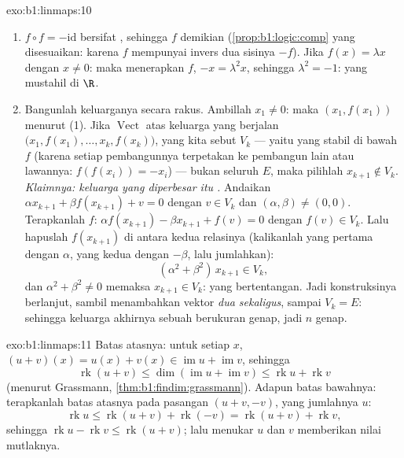 \begin{solution}{exo:b1:linmaps:10}
\begin{enumerate}
  \item {} $f \circ f = -\mathrm{id}$ bersifat , sehingga $f$ demikian
        (\cref{prop:b1:logic:comp} yang disesuaikan: karena $f$ mempunyai invers
        dua sisinya $-f$). Jika $f(x) = \lambda x$ dengan $x \neq 0$:
        maka menerapkan $f$, $-x = \lambda^2 x$, sehingga $\lambda^2 = -1$:
        yang mustahil di $\R$.
  \item Bangunlah keluarganya secara rakus. Ambillah $x_1 \neq 0$: maka $(x_1,
        f(x_1))$  menurut (1). Jika $\operatorname{Vect}$ atas
        keluarga yang berjalan $\bigl(x_1, f(x_1), \dots, x_k,
        f(x_k)\bigr)$, yang kita sebut $V_k$ --- yaitu  yang stabil di bawah $f$
        (karena setiap pembangunnya terpetakan ke pembangun lain atau lawannya:
        $f(f(x_i)) = -x_i$) --- bukan seluruh $E$, maka pilihlah $x_{k+1}
        \notin V_k$. \emph{Klaimnya: keluarga yang diperbesar itu .}
        Andaikan $\alpha x_{k+1} + \beta f(x_{k+1}) + v = 0$ dengan $v
        \in V_k$ dan $(\alpha, \beta) \neq (0,0)$. Terapkanlah $f$:
        $\alpha f(x_{k+1}) - \beta x_{k+1} + f(v) = 0$ dengan $f(v)
        \in V_k$. Lalu hapuslah $f(x_{k+1})$ di antara kedua relasinya
        (kalikanlah yang pertama dengan $\alpha$, yang kedua dengan $-\beta$, lalu
        jumlahkan):
        \[
        (\alpha^2 + \beta^2)\, x_{k+1} \in V_k ,
        \]
        dan $\alpha^2 + \beta^2 \neq 0$ memaksa $x_{k+1} \in V_k$:
        yang bertentangan. Jadi konstruksinya berlanjut, sambil menambahkan vektor
        \emph{dua sekaligus}, sampai $V_k = E$: sehingga keluarga akhirnya sebuah
         berukuran genap, jadi $n$ genap.
\end{enumerate}
\end{solution}

\begin{solution}{exo:b1:linmaps:11}
Batas atasnya: untuk setiap $x$, $(u + v)(x) = u(x) + v(x) \in
\operatorname{im} u + \operatorname{im} v$, sehingga
\[
\operatorname{rk}(u + v)
\leq \dim(\operatorname{im} u + \operatorname{im} v)
\leq \operatorname{rk} u + \operatorname{rk} v
\]
(menurut Grassmann, \cref{thm:b1:findim:grassmann}). Adapun batas bawahnya: terapkanlah
batas atasnya pada pasangan $(u + v, -v)$, yang jumlahnya $u$:
\[
\operatorname{rk} u \leq \operatorname{rk}(u + v) +
\operatorname{rk}(-v) = \operatorname{rk}(u + v) +
\operatorname{rk} v,
\]
sehingga $\operatorname{rk} u - \operatorname{rk} v \leq
\operatorname{rk}(u+v)$; lalu menukar $u$ dan $v$ memberikan nilai
mutlaknya.
\end{solution}

